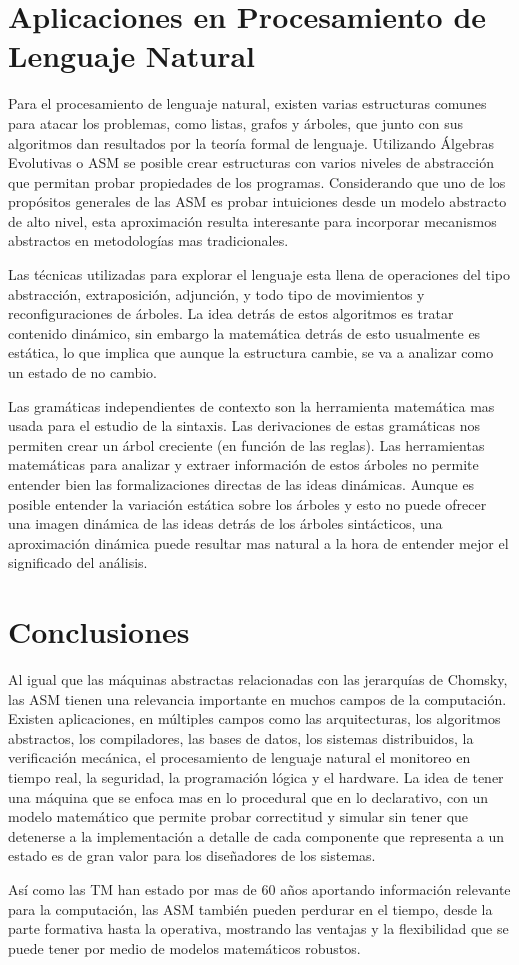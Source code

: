 \documentclass{article}
\begin{document}
\section{Aplicaciones en Procesamiento de Lenguaje Natural}
Para el procesamiento de lenguaje natural, existen varias estructuras comunes para atacar los problemas, como listas, grafos y árboles, que junto con sus algoritmos dan resultados por la teoría formal de lenguaje. Utilizando Álgebras Evolutivas o ASM se posible crear estructuras con varios niveles de abstracción que permitan probar propiedades de los programas. Considerando que uno de los propósitos generales de las ASM es probar intuiciones desde un modelo abstracto de alto nivel, esta aproximación resulta interesante para incorporar mecanismos abstractos en metodologías mas tradicionales.

Las técnicas utilizadas para explorar el lenguaje esta llena de operaciones del tipo abstracción, extraposición, adjunción, y todo tipo de movimientos y reconfiguraciones de árboles. La idea detrás de estos algoritmos es tratar contenido dinámico, sin embargo la matemática detrás de esto usualmente es estática, lo que implica que aunque la estructura cambie, se va a analizar como un estado de no cambio. 

Las gramáticas independientes de contexto son la herramienta matemática mas usada para el estudio de la sintaxis. Las derivaciones de estas gramáticas nos permiten crear un árbol creciente (en función de las reglas). Las herramientas matemáticas para analizar y extraer información de estos árboles no permite entender bien las formalizaciones directas de las ideas dinámicas. Aunque es posible entender la variación estática sobre los árboles y esto no puede ofrecer una imagen dinámica de las ideas detrás de los árboles sintácticos, una aproximación dinámica puede resultar mas natural a la hora de entender mejor el significado del análisis.
\cite{Moss1995EvolvingLanguage}
\section{Conclusiones}
Al igual que las máquinas abstractas relacionadas con las jerarquías de Chomsky, las ASM tienen una relevancia importante en muchos campos de la computación. Existen aplicaciones, en múltiples campos como las arquitecturas, los algoritmos abstractos, los compiladores, las bases de datos, los sistemas distribuidos, la verificación mecánica, el procesamiento de lenguaje natural el monitoreo en tiempo real, la seguridad, la programación lógica y el hardware. La idea de tener una máquina que se enfoca mas en lo procedural que en lo declarativo, con un modelo matemático que permite probar correctitud y simular sin tener que detenerse a la implementación a detalle de cada componente que representa a un estado es de gran valor para los diseñadores de los sistemas.

Así como las TM han estado por mas de 60 años aportando información relevante para la computación, las ASM también pueden perdurar en el tiempo, desde la parte formativa hasta la operativa, mostrando las ventajas y la flexibilidad que se puede tener por medio de modelos matemáticos robustos.
 

\end{document}
